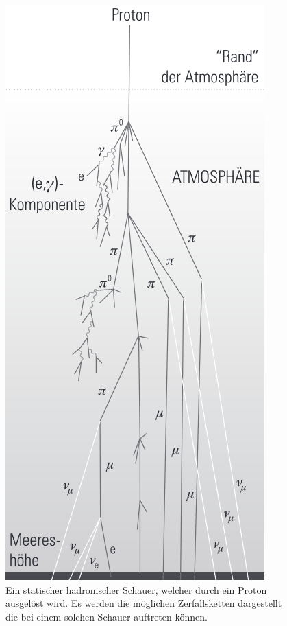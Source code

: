 \begin{figure}
\begin{minipage}{0.4\textwidth}
    \includegraphics[width=\textwidth]{data/hadronischerschauer.png}
    \caption{Ein statischer hadronischer Schauer, welcher durch ein Proton\\ ausgelöst wird.
    Es werden die möglichen Zerfallsketten dargestellt \\ die bei einem solchen Schauer auftreten können. \cite{astroteilchenbuch}}
    \label{fig:hadronischerschauer}
\end{minipage}
\end{figure}\FloatBarrier
